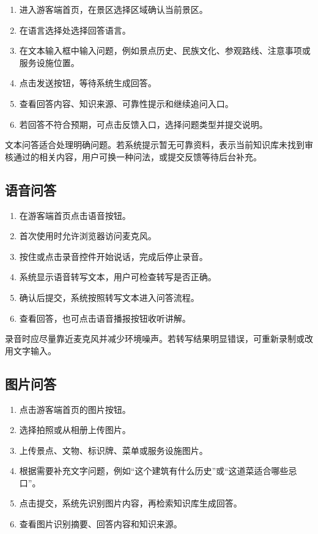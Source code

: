 \begin{enumerate}[leftmargin=2em]
  \item 进入游客端首页，在景区选择区域确认当前景区。
  \item 在语言选择处选择回答语言。
  \item 在文本输入框中输入问题，例如景点历史、民族文化、参观路线、注意事项或服务设施位置。
  \item 点击发送按钮，等待系统生成回答。
  \item 查看回答内容、知识来源、可靠性提示和继续追问入口。
  \item 若回答不符合预期，可点击反馈入口，选择问题类型并提交说明。
\end{enumerate}

文本问答适合处理明确问题。若系统提示暂无可靠资料，表示当前知识库未找到审核通过的相关内容，用户可换一种问法，或提交反馈等待后台补充。


\subsection{语音问答}

\begin{enumerate}[leftmargin=2em]
  \item 在游客端首页点击语音按钮。
  \item 首次使用时允许浏览器访问麦克风。
  \item 按住或点击录音控件开始说话，完成后停止录音。
  \item 系统显示语音转写文本，用户可检查转写是否正确。
  \item 确认后提交，系统按照转写文本进入问答流程。
  \item 查看回答，也可点击语音播报按钮收听讲解。
\end{enumerate}

录音时应尽量靠近麦克风并减少环境噪声。若转写结果明显错误，可重新录制或改用文字输入。


\subsection{图片问答}

\begin{enumerate}[leftmargin=2em]
  \item 点击游客端首页的图片按钮。
  \item 选择拍照或从相册上传图片。
  \item 上传景点、文物、标识牌、菜单或服务设施图片。
  \item 根据需要补充文字问题，例如“这个建筑有什么历史”或“这道菜适合哪些忌口”。
  \item 点击提交，系统先识别图片内容，再检索知识库生成回答。
  \item 查看图片识别摘要、回答内容和知识来源。
\end{enumerate}

